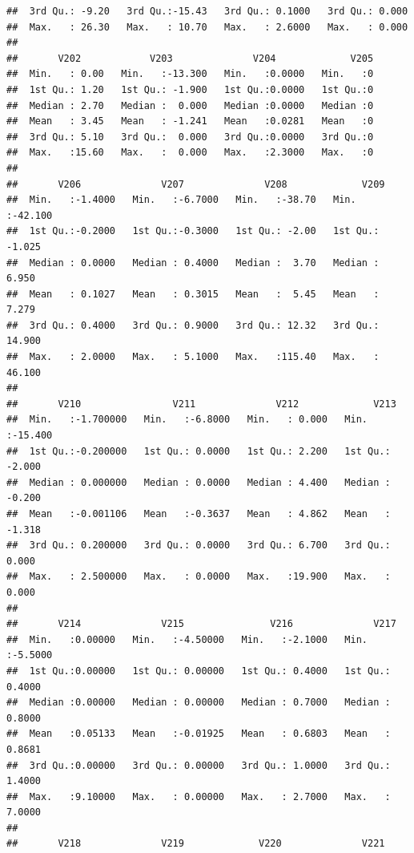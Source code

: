 \documentclass[
]{article}
\begin{document}
\begin{verbatim}
##  3rd Qu.: -9.20   3rd Qu.:-15.43   3rd Qu.: 0.1000   3rd Qu.: 0.000  
##  Max.   : 26.30   Max.   : 10.70   Max.   : 2.6000   Max.   : 0.000  
##                                                                      
##       V202            V203              V204             V205  
##  Min.   : 0.00   Min.   :-13.300   Min.   :0.0000   Min.   :0  
##  1st Qu.: 1.20   1st Qu.: -1.900   1st Qu.:0.0000   1st Qu.:0  
##  Median : 2.70   Median :  0.000   Median :0.0000   Median :0  
##  Mean   : 3.45   Mean   : -1.241   Mean   :0.0281   Mean   :0  
##  3rd Qu.: 5.10   3rd Qu.:  0.000   3rd Qu.:0.0000   3rd Qu.:0  
##  Max.   :15.60   Max.   :  0.000   Max.   :2.3000   Max.   :0  
##                                                                
##       V206              V207              V208             V209        
##  Min.   :-1.4000   Min.   :-6.7000   Min.   :-38.70   Min.   :-42.100  
##  1st Qu.:-0.2000   1st Qu.:-0.3000   1st Qu.: -2.00   1st Qu.: -1.025  
##  Median : 0.0000   Median : 0.4000   Median :  3.70   Median :  6.950  
##  Mean   : 0.1027   Mean   : 0.3015   Mean   :  5.45   Mean   :  7.279  
##  3rd Qu.: 0.4000   3rd Qu.: 0.9000   3rd Qu.: 12.32   3rd Qu.: 14.900  
##  Max.   : 2.0000   Max.   : 5.1000   Max.   :115.40   Max.   : 46.100  
##                                                                        
##       V210                V211              V212             V213        
##  Min.   :-1.700000   Min.   :-6.8000   Min.   : 0.000   Min.   :-15.400  
##  1st Qu.:-0.200000   1st Qu.: 0.0000   1st Qu.: 2.200   1st Qu.: -2.000  
##  Median : 0.000000   Median : 0.0000   Median : 4.400   Median : -0.200  
##  Mean   :-0.001106   Mean   :-0.3637   Mean   : 4.862   Mean   : -1.318  
##  3rd Qu.: 0.200000   3rd Qu.: 0.0000   3rd Qu.: 6.700   3rd Qu.:  0.000  
##  Max.   : 2.500000   Max.   : 0.0000   Max.   :19.900   Max.   :  0.000  
##                                                                          
##       V214              V215               V216              V217        
##  Min.   :0.00000   Min.   :-4.50000   Min.   :-2.1000   Min.   :-5.5000  
##  1st Qu.:0.00000   1st Qu.: 0.00000   1st Qu.: 0.4000   1st Qu.: 0.4000  
##  Median :0.00000   Median : 0.00000   Median : 0.7000   Median : 0.8000  
##  Mean   :0.05133   Mean   :-0.01925   Mean   : 0.6803   Mean   : 0.8681  
##  3rd Qu.:0.00000   3rd Qu.: 0.00000   3rd Qu.: 1.0000   3rd Qu.: 1.4000  
##  Max.   :9.10000   Max.   : 0.00000   Max.   : 2.7000   Max.   : 7.0000  
##                                                                          
##       V218              V219             V220              V221       

\end{verbatim}
\end{document}
